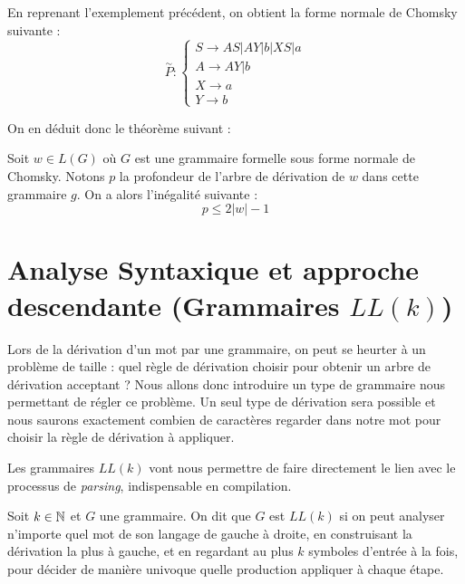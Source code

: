 \begin{example}
    En reprenant l'exemplement précédent, on obtient la forme normale de Chomsky suivante : 
    \[ \overset{\sim}{P} : 
        \begin{cases}
            S \longrightarrow AS | AY | b | XS | a \\ 
            A \longrightarrow AY | b \\ 
            X \longrightarrow a \\ 
            Y \longrightarrow b 
        \end{cases} \] 
\end{example}

On en déduit donc le théorème suivant :

\begin{theorem}
    Soit $w \in L(G)$ où $G$ est une grammaire formelle sous forme normale de Chomsky. 
    Notons $p$ la profondeur de l'arbre de dérivation de $w$ dans cette grammaire $g$. 
    On a alors l'inégalité suivante : 
        \[ \boxed{p \leqslant 2 |w| -1 } \] 
\end{theorem}


\section{Analyse Syntaxique et approche descendante (Grammaires $LL(k)$)}

Lors de la dérivation d'un mot par une grammaire, on peut se heurter à un problème de taille : quel règle de dérivation choisir 
pour obtenir un arbre de dérivation acceptant ? 
Nous allons donc introduire un type de grammaire nous permettant de régler ce problème. Un seul type de dérivation 
sera possible et nous saurons exactement combien de caractères regarder dans notre mot pour choisir la règle 
de dérivation à appliquer. 

Les grammaires $LL(k)$ vont nous permettre de faire directement le lien avec le processus de \emph{parsing}, indispensable 
en compilation. 

\begin{definition}[Grammaire $LL(k)$]
    Soit $k \in \mathbb{N}$ et $G$ une grammaire. On dit que $G$ est $LL(k)$ si on peut analyser n’importe quel mot 
    de son langage de gauche à droite, en construisant la dérivation la plus à gauche, et en regardant au plus $k$ 
    symboles d’entrée à la fois, pour décider de manière univoque quelle production appliquer à chaque étape.
\end{definition}

